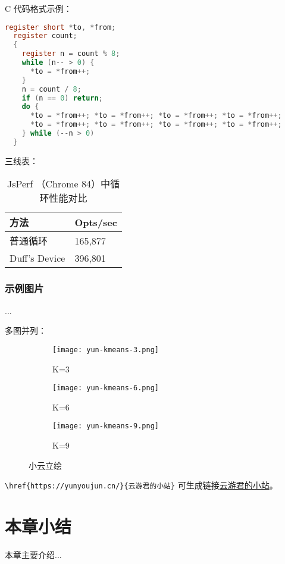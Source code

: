 C 代码格式示例：

\begin{lstlisting}[language=c]
  register short *to, *from;
  register count;
  {
    register n = count % 8;
    while (n-- > 0) { 
      *to = *from++;
    }
    n = count / 8;
    if (n == 0) return;     
    do {
      *to = *from++; *to = *from++; *to = *from++; *to = *from++;
      *to = *from++; *to = *from++; *to = *from++; *to = *from++;
    } while (--n > 0)
  }
\end{lstlisting}

三线表：

\begin{table}[h]
  \centering
  \caption{JsPerf （Chrome 84）中循环性能对比}
  \begin{tabular}{p{5cm}p{2cm}}
      \toprule
      \textbf{方法}  & \textbf{Opts/sec} \\
      \midrule
      普通循环 & 165,877  \\
      Duff's Device & 396,801\\
      \bottomrule
  \end{tabular}
  \label{tab:jsperf-efficiency}
\end{table}

\subsubsection{示例图片}

...

多图并列：

\begin{figure}[htbp]
  \centering
  \begin{subfigure}[t]{0.3\textwidth}
  \centering
  \texttt{[image: yun-kmeans-3.png]}
  \caption{K=3}
  \end{subfigure}
  \begin{subfigure}[t]{0.3\textwidth}
  \centering
  \texttt{[image: yun-kmeans-6.png]}
  \caption{K=6}
  \end{subfigure}
  \begin{subfigure}[t]{0.3\textwidth}
  \centering
  \texttt{[image: yun-kmeans-9.png]}
  \caption{K=9}
  \end{subfigure}
  \caption{小云立绘}
  \label{fig:kmeans-png}
\end{figure}


\verb!\href{https://yunyoujun.cn/}{云游君的小站}! 可生成链接\href{https://yunyoujun.cn/}{云游君的小站}。



\section{本章小结}

本章主要介绍...

